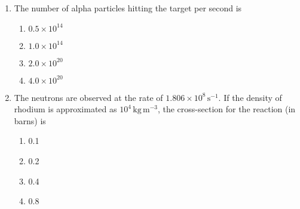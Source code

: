 \documentclass[journal,12pt,onecolumn]{IEEEtran}
\theoremstyle{remark}
\begin{document}
\begin{enumerate}
    \item  The number of alpha particles hitting the target per second is
    \begin{multicols}{4}
    \begin{enumerate}
        \item $0.5 \times 10^{14}$
        \item $1.0 \times 10^{14}$
        \item $2.0 \times 10^{20}$
        \item $4.0 \times 10^{20}$
    \end{enumerate}
    \end{multicols}

    \item  The neutrons are observed at the rate of $1.806 \times 10^8 \, \text{s}^{-1}$. If the density of rhodium is approximated as $10^4 \, \text{kg} \, \text{m}^{-3}$, the cross-section for the reaction (in barns) is
    \begin{multicols}{4}
    \begin{enumerate}
        \item 0.1
        \item 0.2
        \item 0.4
        \item 0.8
    \end{enumerate}
    \end{multicols}
\end{enumerate}
\end{document}
